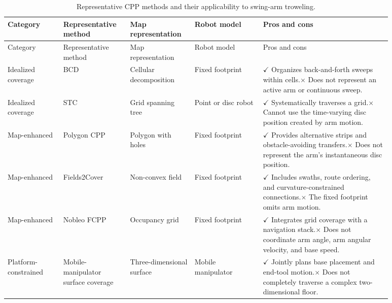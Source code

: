 \begin{longtable}{@{}>{\raggedright\arraybackslash}p{0.13\linewidth}>{\raggedright\arraybackslash}p{0.15\linewidth}>{\raggedright\arraybackslash}p{0.14\linewidth}>{\raggedright\arraybackslash}p{0.16\linewidth}>{\raggedright\arraybackslash}p{0.30\linewidth}@{}}
\caption{Representative CPP methods and their applicability to swing-arm troweling.}\label{tab:cpp-comparison}\\
\toprule
Category & Representative method & Map representation & Robot model & Pros and cons \\
\midrule
\endfirsthead
\toprule
Category & Representative method & Map representation & Robot model & Pros and cons \\
\midrule
\endhead
Idealized coverage & BCD \cite{choset1998} & Cellular decomposition & Fixed footprint & $\checkmark$ Organizes back-and-forth sweeps within cells.\newline $\times$ Does not represent an active arm or continuous sweep. \\
Idealized coverage & STC \cite{gabriely2001} & Grid spanning tree & Point or disc robot & $\checkmark$ Systematically traverses a grid.\newline $\times$ Cannot use the time-varying disc position created by arm motion. \\
Map-enhanced & Polygon CPP \cite{bahnemann2021,polygoncoverage} & Polygon with holes & Fixed footprint & $\checkmark$ Provides alternative strips and obstacle-avoiding transfers.\newline $\times$ Does not represent the arm's instantaneous disc position. \\
Map-enhanced & Fields2Cover \cite{mier2023,fields2cover} & Non-convex field & Fixed footprint & $\checkmark$ Includes swaths, route ordering, and curvature-constrained connections.\newline $\times$ The fixed footprint omits arm motion. \\
Map-enhanced & Nobleo FCPP \cite{nobleo} & Occupancy grid & Fixed footprint & $\checkmark$ Integrates grid coverage with a navigation stack.\newline $\times$ Does not coordinate arm angle, arm angular velocity, and base speed. \\
Platform-constrained & Mobile-manipulator surface coverage \cite{thakar2022} & Three-dimensional surface & Mobile manipulator & $\checkmark$ Jointly plans base placement and end-tool motion.\newline $\times$ Does not completely traverse a complex two-dimensional floor. \\

\end{longtable}
